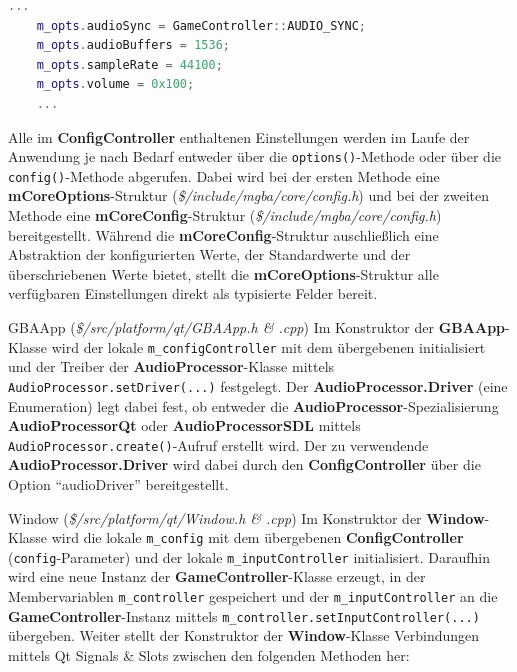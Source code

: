 \documentclass[11pt,a4paper]{scrartcl}
\begin{document}
\vspace{5mm}
\begin{lstlisting}[language=C++, caption={Ausschnitt aus dem Konstruktor der ConfigController-Klasse}, label={list:ConfigController_ctor}]
    ...
	m_opts.audioSync = GameController::AUDIO_SYNC;
	m_opts.audioBuffers = 1536;
	m_opts.sampleRate = 44100;
	m_opts.volume = 0x100;
	...
\end{lstlisting}

Alle im \textbf{ConfigController} enthaltenen Einstellungen werden im Laufe der Anwendung je nach Bedarf entweder \"uber die \verb|options()|-Methode oder \"uber die \verb|config()|-Methode abgerufen. Dabei wird bei der ersten Methode eine \textbf{mCoreOptions}-Struktur (\textit{\$/include/mgba/core/config.h}) und bei der zweiten Methode eine \textbf{mCoreConfig}-Struktur (\textit{\$/include/mgba/core/config.h}) bereitgestellt. W\"ahrend die \textbf{mCoreConfig}-Struktur auschlie{\ss}lich eine Abstraktion der konfigurierten Werte, der Standardwerte und der \"uberschriebenen Werte bietet, stellt die \textbf{mCoreOptions}-Struktur alle verf\"ugbaren Einstellungen direkt als typisierte Felder bereit.

\vspace{5mm}
\large GBAApp \normalsize(\textit{\$/src/platform/qt/GBAApp.h \& .cpp})
\vspace{2mm}\newline
Im Konstruktor der \textbf{GBAApp}-Klasse wird der lokale \verb|m_configController| mit dem \"ubergebenen initialisiert und der Treiber der \textbf{AudioProcessor}-Klasse mittels \verb|AudioProcessor.setDriver(...)| festgelegt. Der \textbf{AudioProcessor.Driver} (eine Enumeration) legt dabei fest, ob entweder die \textbf{AudioProcessor}-Spezialisierung \textbf{AudioProcessorQt} oder \textbf{AudioProcessorSDL} mittels \verb|AudioProcessor.create()|-Aufruf erstellt wird. Der zu verwendende \textbf{AudioProcessor.Driver} wird dabei durch den \textbf{ConfigController} \"uber die Option \enquote{audioDriver} bereitgestellt.

\vspace{5mm}
\large Window \normalsize(\textit{\$/src/platform/qt/Window.h \& .cpp})
\vspace{2mm}\newline
Im Konstruktor der \textbf{Window}-Klasse wird die lokale \verb|m_config| mit dem \"ubergebenen \textbf{ConfigController} (\verb|config|-Parameter) und der lokale \verb|m_inputController| initialisiert. Daraufhin wird eine neue Instanz der \textbf{GameController}-Klasse erzeugt, in der Membervariablen \verb|m_controller| gespeichert und der \verb|m_inputController| an die \textbf{GameController}-Instanz mittels \verb|m_controller.setInputController(...)| \"ubergeben. Weiter stellt der Konstruktor der \textbf{Window}-Klasse Verbindungen mittels Qt Signals \& Slots zwischen den folgenden Methoden her:
\end{document}
